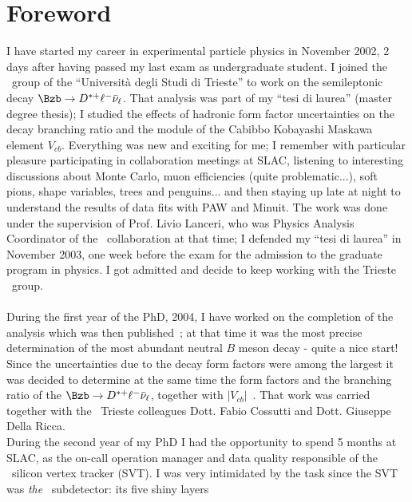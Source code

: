\chapter*{Foreword}

I have started my career in experimental particle physics in November 2002, 2 days after having passed 
my last exam as  undergraduate student. I joined the \babar\ group of the ``Universit\`a degli Studi 
di Trieste'' to work on the semileptonic decay $\Bzb\to D^{*+}\ell^{-}\bar{\nu}_{\ell}$. That analysis 
was part of my ``tesi di laurea'' (master degree thesis); I studied the effects of hadronic form factor 
uncertainties on the decay branching ratio
 and the module of the Cabibbo Kobayashi Maskawa element $V_{cb}$. 
 Everything was new and exciting for me; I remember 
with particular pleasure participating in collaboration meetings at SLAC, listening to interesting 
discussions about Monte Carlo, muon efficiencies (quite problematic...), soft pions, shape variables, 
trees and penguins... and then staying up late at night to understand the results of data fits with PAW 
and Minuit.
\newline The work was done under the supervision of Prof. Livio Lanceri, who was Physics Analysis Coordinator 
of the \babar\ collaboration at that time;   I defended my ``tesi di laurea'' in November 2003, 
one week before the exam for the admission to the graduate program in physics. I got admitted 
and decide to keep working with the Trieste \babar\ group.
\\ \\
During the first year of the PhD, 2004, I have worked on the completion of the analysis which was 
then published~\cite{PhysRevD.71.051502}; at that time it was the most precise determination of the most 
abundant neutral $B$ meson decay - quite a nice start! 
Since the uncertainties due to the decay form factors were among the largest  it was decided 
to determine at the same time the form factors and  the branching ratio of the 
$\Bzb\to D^{*+}\ell^{-}\bar{\nu}_{\ell}$, together with $|V_{cb}|$~\cite{PhysRevD.77.032002}. 
That work was carried together with the \babar\ Trieste colleagues Dott. Fabio Cossutti and Dott. 
Giuseppe Della Ricca.
\\During the second year of my PhD I had the opportunity to spend 5 months at SLAC, as 
the on-call operation manager and data quality responsible of the \babar\ silicon vertex tracker (SVT). 
I was very intimidated by the task since the SVT was {\it the} \babar\ subdetector: its five shiny layers 
